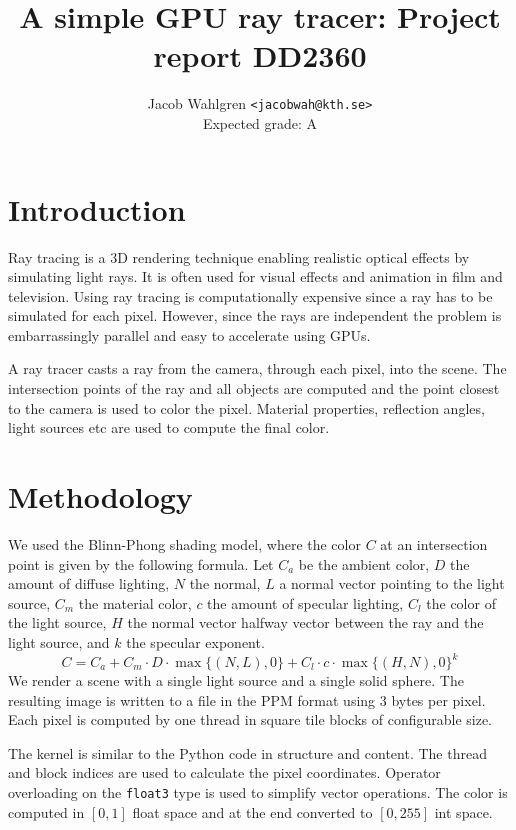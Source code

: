 \documentclass{article}
\title{A simple GPU ray tracer: Project report DD2360}
\author{Jacob Wahlgren \texttt{<jacobwah@kth.se>} \\ Expected grade: A}
\begin{document}
\maketitle

\section{Introduction}

Ray tracing is a 3D rendering technique enabling realistic optical effects by
simulating light rays. It is often used for visual effects and animation in film
and television. Using ray tracing is computationally expensive since a ray has
to be simulated for each pixel. However, since the rays are independent the
problem is embarrassingly parallel and easy to accelerate using GPUs.

A ray tracer casts a ray from the camera, through each pixel, into the scene.
The intersection points of the ray and all objects are computed and the point
closest to the camera is used to color the pixel. Material properties,
reflection angles, light sources etc are used to compute the final color.

\section{Methodology}

We used the Blinn-Phong shading model, where the color $C$ at an intersection
point is given by the following formula. Let $C_a$ be the ambient color, $D$
the amount of diffuse lighting, $N$ the normal, $L$ a normal vector pointing to
the light source, $C_m$ the material color, $c$ the amount of specular lighting, $C_l$ the color of the
light source, $H$ the normal vector halfway vector between the ray and the light
source, and $k$ the specular exponent.
\begin{equation}
    C = C_a + C_m \cdot D \cdot \max\{(N, L), 0\} + C_l \cdot c \cdot \max\{(H, N),
    0\}^k
\end{equation}
We render a scene with a single light source and a single solid sphere. The
resulting image is written to a file in the PPM format using 3 bytes per pixel.
Each pixel is computed by one thread in square tile blocks of configurable
size.

The kernel is similar to the Python code in structure and content. The thread
and block indices are used to calculate the pixel coordinates. Operator
overloading on the \verb|float3| type is used to simplify vector operations. The
color is computed in $[0,1]$ float space and at the end converted to $[0,255]$
int space.
\end{document}
